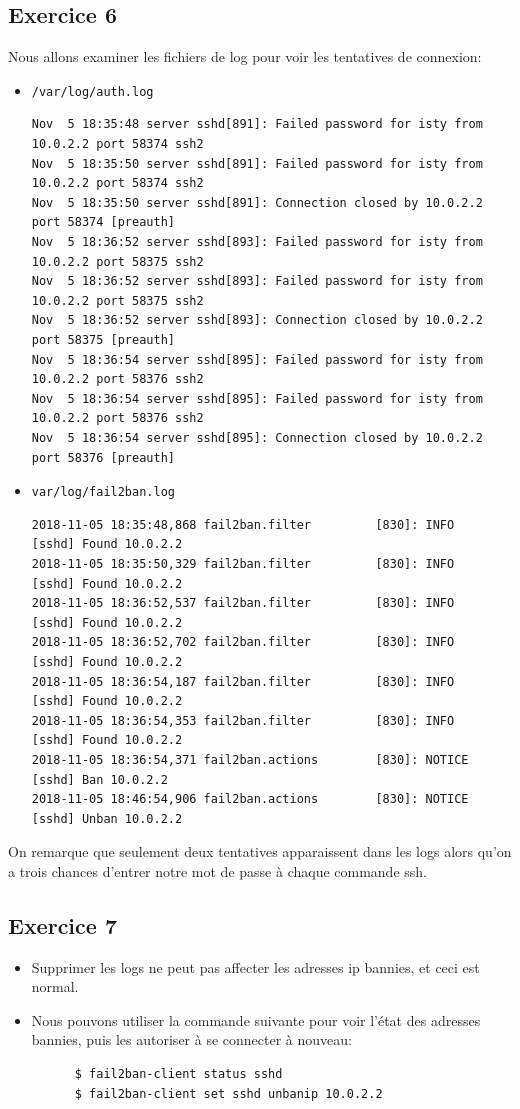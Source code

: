 \documentclass{report}
\begin{document}
\subsection{Exercice 6}
Nous allons examiner les fichiers de log pour voir les tentatives de connexion:
\begin{itemize}
  \item \texttt{/var/log/auth.log}
    \begin{verbatim}
Nov  5 18:35:48 server sshd[891]: Failed password for isty from 10.0.2.2 port 58374 ssh2
Nov  5 18:35:50 server sshd[891]: Failed password for isty from 10.0.2.2 port 58374 ssh2
Nov  5 18:35:50 server sshd[891]: Connection closed by 10.0.2.2 port 58374 [preauth]
Nov  5 18:36:52 server sshd[893]: Failed password for isty from 10.0.2.2 port 58375 ssh2
Nov  5 18:36:52 server sshd[893]: Failed password for isty from 10.0.2.2 port 58375 ssh2
Nov  5 18:36:52 server sshd[893]: Connection closed by 10.0.2.2 port 58375 [preauth]
Nov  5 18:36:54 server sshd[895]: Failed password for isty from 10.0.2.2 port 58376 ssh2
Nov  5 18:36:54 server sshd[895]: Failed password for isty from 10.0.2.2 port 58376 ssh2
Nov  5 18:36:54 server sshd[895]: Connection closed by 10.0.2.2 port 58376 [preauth]

    \end{verbatim}
  \item \texttt{var/log/fail2ban.log}
      \begin{verbatim}
2018-11-05 18:35:48,868 fail2ban.filter         [830]: INFO    [sshd] Found 10.0.2.2
2018-11-05 18:35:50,329 fail2ban.filter         [830]: INFO    [sshd] Found 10.0.2.2
2018-11-05 18:36:52,537 fail2ban.filter         [830]: INFO    [sshd] Found 10.0.2.2
2018-11-05 18:36:52,702 fail2ban.filter         [830]: INFO    [sshd] Found 10.0.2.2
2018-11-05 18:36:54,187 fail2ban.filter         [830]: INFO    [sshd] Found 10.0.2.2
2018-11-05 18:36:54,353 fail2ban.filter         [830]: INFO    [sshd] Found 10.0.2.2
2018-11-05 18:36:54,371 fail2ban.actions        [830]: NOTICE  [sshd] Ban 10.0.2.2
2018-11-05 18:46:54,906 fail2ban.actions        [830]: NOTICE  [sshd] Unban 10.0.2.2
      \end{verbatim}
  \end{itemize}
On remarque que seulement deux tentatives apparaissent dans les logs alors qu'on a trois chances
d'entrer notre mot de passe à chaque commande ssh.

\subsection{Exercice 7}
\begin{itemize}
  \item Supprimer les logs ne peut pas affecter les adresses ip bannies, et ceci est normal.
  \item Nous pouvons utiliser la commande suivante pour voir l'état des adresses bannies, puis les
  autoriser à se connecter à nouveau:
  \begin{tcolorbox}
    \begin{verbatim}
      $ fail2ban-client status sshd
      $ fail2ban-client set sshd unbanip 10.0.2.2
    \end{verbatim}
  \end{tcolorbox}
\end{itemize}
\end{document}
